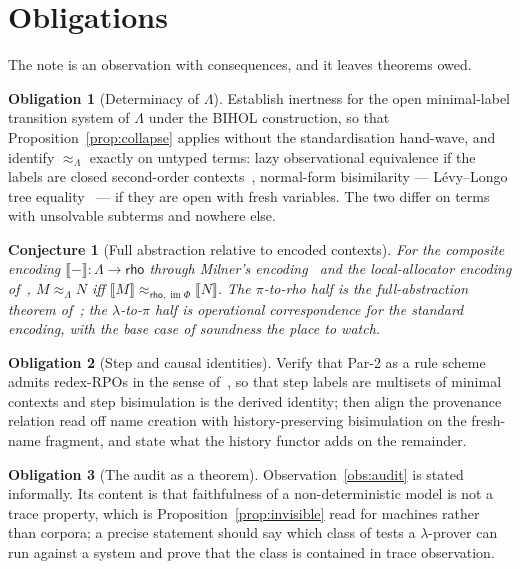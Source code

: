 \documentclass[11pt]{article}
\theoremstyle{plain}
\newtheorem{conjecture}[theorem]{Conjecture}
\theoremstyle{definition}
\newtheorem{obligation}{Obligation}
\theoremstyle{remark}
\newcommand{\Lam}{\Lambda}
\newcommand{\rhoc}{\textsf{rho}}
\newcommand{\bisW}[1]{\approx_{#1}}
\newcommand{\enc}[1]{\llbracket #1 \rrbracket}
\begin{document}
\section{Obligations}\label{sec:obligations}

The note is an observation with consequences, and it leaves theorems owed.

\begin{obligation}[Determinacy of $\Lam$]
Establish inertness for the open minimal-label transition system of $\Lam$
under the BIHOL construction, so that Proposition~\ref{prop:collapse} applies
without the standardisation hand-wave, and identify $\bisW{\Lam}$ exactly on
untyped terms: lazy observational equivalence if the labels are closed
second-order contexts~\cite{DHL09}, normal-form bisimilarity --- L\'evy--Longo
tree equality~\cite{Lassen99} --- if they are open with fresh variables. The
two differ on terms with unsolvable subterms and nowhere else.
\end{obligation}

\begin{conjecture}[Full abstraction relative to encoded contexts]\label{conj:fullabs}
For the composite encoding $\enc{-} : \Lam \to \rhoc$ through Milner's
encoding~\cite{Milner92} and the local-allocator encoding of~\cite{NoWNS},
$M \bisW{\Lam} N$ iff $\enc{M} \bisW{\rhoc,\operatorname{im}\Phi} \enc{N}$.
The $\pi$-to-rho half is the full-abstraction theorem of~\cite{NoWNS}; the
$\lambda$-to-$\pi$ half is operational correspondence for the standard
encoding, with the base case of soundness the place to watch.
\end{conjecture}

\begin{obligation}[Step and causal identities]
Verify that Par-2 as a rule scheme admits redex-RPOs in the sense
of~\cite{BIHOL}, so that step labels are multisets of minimal contexts and
step bisimulation is the derived identity; then align the provenance relation
read off name creation with history-preserving bisimulation on the fresh-name
fragment, and state what the history functor adds on the remainder.
\end{obligation}

\begin{obligation}[The audit as a theorem]
Observation~\ref{obs:audit} is stated informally. Its content is that
faithfulness of a non-deterministic model is not a trace property, which is
Proposition~\ref{prop:invisible} read for machines rather than corpora; a
precise statement should say which class of tests a $\lambda$-prover can run
against a system and prove that the class is contained in trace observation.
\end{obligation}
\end{document}
